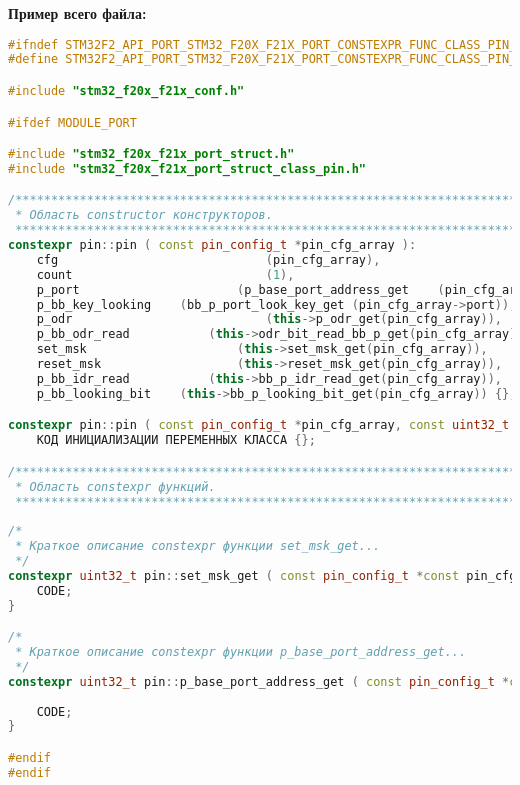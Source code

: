 \textbf{Пример всего файла:}\begin{lstlisting}[language=C++, frame=tlBR, basicstyle=\fontsize{10}{10}\ttfamily]
#ifndef STM32F2_API_PORT_STM32_F20X_F21X_PORT_CONSTEXPR_FUNC_CLASS_PIN_H_
#define STM32F2_API_PORT_STM32_F20X_F21X_PORT_CONSTEXPR_FUNC_CLASS_PIN_H_

#include "stm32_f20x_f21x_conf.h"

#ifdef MODULE_PORT

#include "stm32_f20x_f21x_port_struct.h"
#include "stm32_f20x_f21x_port_struct_class_pin.h"

/**********************************************************************
 * Область constructor конструкторов.
 **********************************************************************/
constexpr pin::pin ( const pin_config_t *pin_cfg_array ):
	cfg								(pin_cfg_array),
	count							(1),
	p_port						(p_base_port_address_get	(pin_cfg_array->port)),
	p_bb_key_looking	(bb_p_port_look_key_get	(pin_cfg_array->port)),
	p_odr							(this->p_odr_get(pin_cfg_array)),
	p_bb_odr_read			(this->odr_bit_read_bb_p_get(pin_cfg_array)),
	set_msk						(this->set_msk_get(pin_cfg_array)),
	reset_msk					(this->reset_msk_get(pin_cfg_array)),
	p_bb_idr_read			(this->bb_p_idr_read_get(pin_cfg_array)),
	p_bb_looking_bit	(this->bb_p_looking_bit_get(pin_cfg_array)) {};

constexpr pin::pin ( const pin_config_t *pin_cfg_array, const uint32_t pin_cout ):
	КОД ИНИЦИАЛИЗАЦИИ ПЕРЕМЕННЫХ КЛАССА {};

/**********************************************************************
 * Область constexpr функций.
 **********************************************************************/
 
/*
 * Краткое описание constexpr функции set_msk_get...
 */
constexpr uint32_t pin::set_msk_get ( const pin_config_t *const pin_cfg_array ) {
	CODE;
}

/*
 * Краткое описание constexpr функции p_base_port_address_get...
 */
constexpr uint32_t pin::p_base_port_address_get ( const pin_config_t *const 
																									pin_cfg_array ) {
	CODE;
}

#endif
#endif\end{lstlisting}

